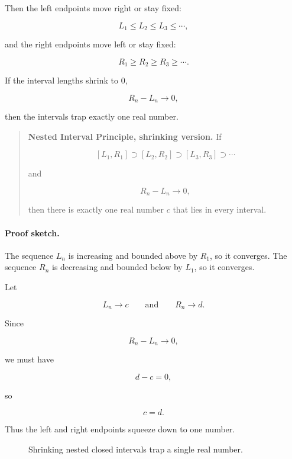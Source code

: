 Then the left endpoints move right or stay fixed:

\[
L_1\le L_2\le L_3\le\cdots,
\]

and the right endpoints move left or stay fixed:

\[
R_1\ge R_2\ge R_3\ge\cdots.
\]

If the interval lengths shrink to \(0\),

\[
R_n-L_n\to0,
\]

then the intervals trap exactly one real number.

\begin{quote}
\textbf{Nested Interval Principle, shrinking version.}
If

\[
[L_1,R_1]\supset [L_2,R_2]\supset [L_3,R_3]\supset\cdots
\]

and

\[
R_n-L_n\to0,
\]

then there is exactly one real number \(c\) that lies in every interval.
\end{quote}

\paragraph{Proof sketch.}
The sequence \(L_n\) is increasing and bounded above by \(R_1\), so it converges.
The sequence \(R_n\) is decreasing and bounded below by \(L_1\), so it converges.

Let

\[
L_n\to c
\qquad\text{and}\qquad
R_n\to d.
\]

Since

\[
R_n-L_n\to0,
\]

we must have

\[
d-c=0,
\]

so

\[
c=d.
\]

Thus the left and right endpoints squeeze down to one number.

\begin{figure}[h]
\centering
{}
\caption{Shrinking nested closed intervals trap a single real number.}
\label{fig:nested-intervals-shrink}
\end{figure}

